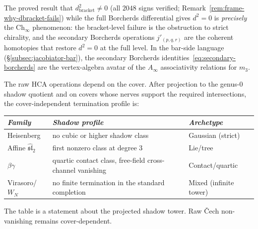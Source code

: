 \begin{remark}
\label{rem:secondary-borcherds-d2}
The proved result that $d_{\mathrm{bracket}}^2 \neq 0$ (all $2048$
signs verified; Remark~\ref{rem:frame-why-dbracket-fails})
while the full Borcherds differential gives $d^2 = 0$ is \emph{precisely}
the Ch$_\infty$ phenomenon: the bracket-level failure is the obstruction
to strict chirality, and the secondary Borcherds operations
$j'_{(p,q,r)}$ are the coherent homotopies that restore $d^2 = 0$ at
the full level. In the bar-side language
(\S\ref{subsec:jacobiator-bar}), the secondary Borcherds
identities~\eqref{eq:secondary-borcherds} are the vertex-algebra
avatar of the $A_\infty$ associativity relations for $m_3$.

The raw HCA operations depend on the cover.  After projection to the
genus-$0$ shadow quotient and on covers whose nerves support the
required intersections, the cover-independent termination profile is:
\begin{center}
\renewcommand{\arraystretch}{1.2}
\begin{tabular}{lll}
\toprule
\emph{Family} & \emph{Shadow profile} & \emph{Archetype} \\
\midrule
Heisenberg & no cubic or higher shadow class & Gaussian (strict) \\
Affine $\widehat{\mathfrak{sl}}_2$ & first nonzero class at degree $3$ & Lie/tree \\
$\beta\gamma$ & quartic contact class, free-field cross-channel vanishing & Contact/quartic \\
Virasoro/$W_N$ & no finite termination in the standard completion & Mixed (infinite tower) \\
\bottomrule
\end{tabular}
\end{center}
The table is a statement about the projected shadow tower.  Raw
\v{C}ech non-vanishing remains cover-dependent.
\end{remark}

